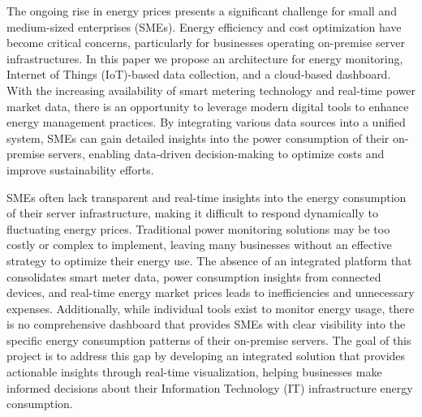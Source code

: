 The ongoing rise in energy prices presents a significant challenge for small and medium-sized enterprises (SMEs).
Energy efficiency and cost optimization have become critical concerns, particularly for businesses operating on-premise server infrastructures.
In this paper we propose an architecture for energy monitoring, Internet of Things (IoT)-based data collection, and a cloud-based dashboard.
With the increasing availability of smart metering technology and real-time power market data, there is an opportunity to leverage modern digital tools
to enhance energy management practices.
By integrating various data sources into a unified system, SMEs can gain detailed insights into the power consumption of their on-premise servers, 
enabling data-driven decision-making to optimize costs and improve sustainability efforts.

SMEs often lack transparent and real-time insights into the energy consumption of their server infrastructure, making it difficult to respond dynamically to fluctuating energy prices. 
Traditional power monitoring solutions may be too costly or complex to implement, leaving many businesses without an effective strategy to optimize their energy use. 
The absence of an integrated platform that consolidates smart meter data, power consumption insights from connected devices, and real-time energy market prices leads
to inefficiencies and unnecessary expenses.
Additionally, while individual tools exist to monitor energy usage, there is no comprehensive dashboard that provides SMEs with clear visibility 
into the specific energy consumption patterns of their on-premise servers. 
The goal of this project is to address this gap by developing an integrated solution that provides actionable insights through real-time visualization, 
helping businesses make informed decisions about their Information Technology (IT) infrastructure energy consumption.

